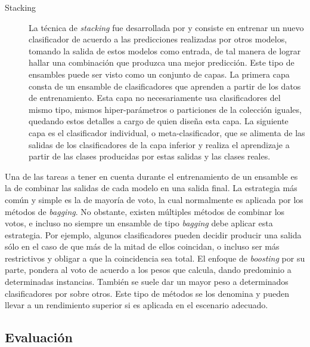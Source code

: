 \begin{description}
   \item[Stacking] La técnica de \textit{stacking} fue desarrollada por
      \citeauthor{wolpert_stacked_1992}\cite{wolpert_stacked_1992} y consiste en
      entrenar un nuevo clasificador de acuerdo a las predicciones realizadas
      por otros modelos, tomando la salida de estos modelos como entrada, de tal
      manera de lograr hallar una combinación que produzca una mejor predicción.
      Este tipo de ensambles puede ser visto como un conjunto de capas. La
      primera capa consta de un ensamble de clasificadores que aprenden a partir
      de los datos de entrenamiento. Esta capa no necesariamente usa
      clasificadores del mismo tipo, mismos hiper-parámetros o particiones de la
      colección iguales, quedando estos detalles a cargo de quien diseña esta
      capa. La siguiente capa es el clasificador individual, o
      meta-clasificador, que se alimenta de las salidas de los clasificadores de
      la capa inferior y realiza el aprendizaje a partir de las clases
      producidas por estas salidas y las clases reales.

\end{description}

Una de las tareas a tener en cuenta durante el entrenamiento de un ensamble es
la de combinar las salidas de cada modelo en una salida final. La estrategia más
común y simple es la de mayoría de voto, la cual normalmente es aplicada por los
métodos de \textit{bagging}. No obstante, existen múltiples métodos de combinar
los votos, e incluso no siempre un ensamble de tipo \textit{bagging} debe
aplicar esta estrategia. Por ejemplo, algunos clasificadores pueden decidir
producir una salida sólo en el caso de que más de la mitad de ellos coincidan, o
incluso ser más restrictivos y obligar a que la coincidencia sea total. El
enfoque de \textit{boosting} por su parte, pondera al voto de acuerdo a los
pesos que calcula, dando predominio a determinadas instancias.  También se suele
dar un mayor peso a determinados clasificadores por sobre otros. Este tipo de
métodos se los denomina  y pueden llevar a
un rendimiento superior si es aplicada en el escenario adecuado.



\subsection{Evaluación}
\label{evaluacion_intro}

